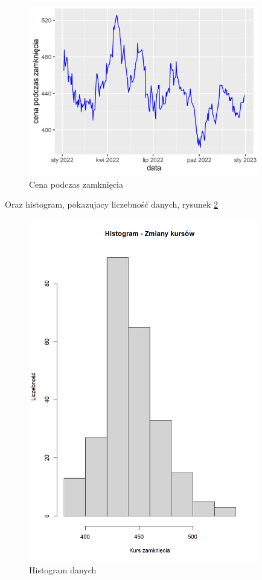 \documentclass[a4paper,11pt]{article}
\begin{document}
\begin{figure}[h]
  \centering
  \includegraphics[width=10cm]{cena_poczas_zamkn.png}
  \caption{Cena podczas zamknięcia}
  \label{fig:cena_podcaz_zamkn}
\end{figure}

Oraz histogram, pokazujacy liczebność danych, rysunek \ref{fig:histogram}
\begin{figure}[h]
  \centering
  \includegraphics[width=10cm]{histogram.png}
  \caption{Histogram danych}
  \label{fig:histogram}
\end{figure}
\end{document}
